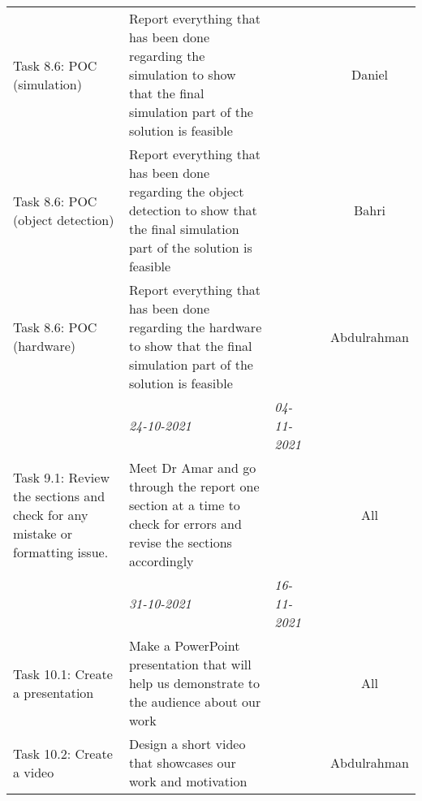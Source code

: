\begin{center}
\begin{small}
\begin{xltabular}{\textwidth}{ p{3cm} p{5cm} X X c }
            Task 8.6: POC (simulation)
                & Report everything that has been done
                regarding the simulation to show that
                the final simulation part of the solution
                is feasible & & & Daniel \\

            Task 8.6: POC (object detection)
                & Report everything that has been done
                regarding the object detection to show that
                the final simulation part of the solution
                is feasible & & & Bahri \\

            Task 8.6: POC (hardware)
                & Report everything that has been done
                regarding the hardware to show that
                the final simulation part of the solution
                is feasible & & & Abdulrahman \\

            \addlinespace
                & \emph{24-10-2021} & \emph{04-11-2021} & 
            \\ \addlinespace

            Task 9.1: Review the sections and check for any 
            mistake or formatting issue.
                & Meet Dr Amar and go through the report
                one section at a time to check for errors
                and revise the sections accordingly & & & All 
                \\

            \addlinespace
                & \emph{31-10-2021} & \emph{16-11-2021} & 
            \\ \addlinespace

            Task 10.1: Create a presentation
                & Make a PowerPoint presentation that
                will help us demonstrate to the audience
                about our work & & & All \\

            Task 10.2: Create a video
                & Design a short video that showcases
                our work and motivation & & & Abdulrahman \\

            \bottomrule
        \end{xltabular}
    \end{small}
\end{center}

